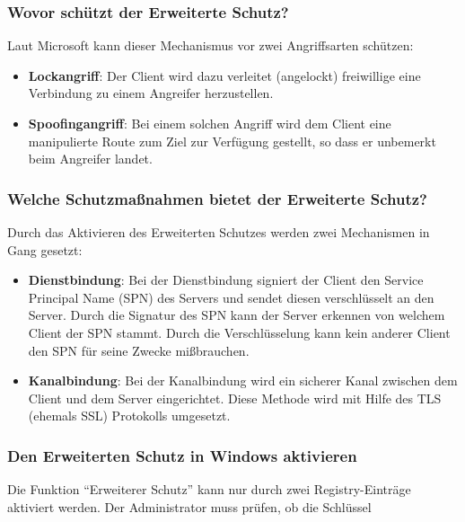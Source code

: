         \subsubsection{Wovor schützt der Erweiterte Schutz?}
          Laut Microsoft kann dieser Mechanismus vor zwei Angriffsarten
          schützen:
          \begin{itemize}
            \item \textbf{Lockangriff}: Der Client wird dazu verleitet
            (angelockt) freiwillige eine Verbindung zu einem Angreifer
            herzustellen.
            \item \textbf{Spoofingangriff}: Bei einem solchen Angriff wird dem
            Client eine manipulierte Route zum Ziel zur Verfügung gestellt, so
            dass er unbemerkt beim Angreifer landet.
          \end{itemize}
        \subsubsection{Welche Schutzmaßnahmen bietet der Erweiterte Schutz?}
          Durch das Aktivieren des Erweiterten Schutzes werden zwei Mechanismen
          in Gang gesetzt:
          \begin{itemize}
            \item \textbf{Dienstbindung}: Bei der Dienstbindung signiert der
            Client den Service Principal Name (SPN) des Servers und sendet
            diesen verschlüsselt an den Server. Durch die Signatur des SPN kann
            der Server erkennen von welchem Client der SPN stammt. Durch die
            Verschlüsselung kann kein anderer Client den SPN für seine Zwecke
            mißbrauchen.
            \item \textbf{Kanalbindung}: Bei der Kanalbindung wird ein sicherer
            Kanal zwischen dem Client und dem Server eingerichtet. Diese Methode
            wird mit Hilfe des TLS (ehemals SSL) Protokolls umgesetzt.
          \end{itemize}
          \begin{literaturinternet}
            \item \cite{ff487261}
          \end{literaturinternet}          
        \subsubsection{Den Erweiterten Schutz in Windows aktivieren}
          Die Funktion \enquote{Erweiterer Schutz} kann nur durch zwei
          Registry-Einträge aktiviert werden. Der Administrator muss prüfen, ob
          die Schlüssel
          
